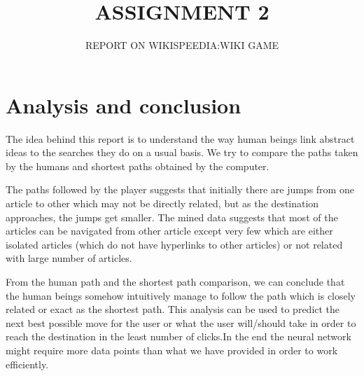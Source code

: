 \documentclass{article}
\title{ASSIGNMENT 2}
\author{REPORT ON WIKISPEEDIA:WIKI GAME }
\begin{document}
\maketitle

\section{Analysis and conclusion}
{ The idea behind this report is to understand the way human beings link abstract ideas to the searches they do on a usual basis. We try to compare the paths taken by the humans and shortest paths obtained by the computer. 
\par The paths followed by the player suggests that initially there are jumps from one article to other which may not be directly related, but as the destination approaches, the jumps get smaller. The mined data suggests that most of the articles can be navigated from other article except very few which are either isolated articles (which do not have hyperlinks to other articles) or not related with large number of articles.
\par From the human path and the shortest path comparison, we can conclude that the human beings somehow intuitively manage to follow the path which is closely related or exact as the shortest path. This analysis can be used to predict the next best possible move for the user or what the user will/should take in order to reach the destination in the least number of clicks.In the end the neural network might require more data points than what we have provided in order to work efficiently.
}
\end{document}
